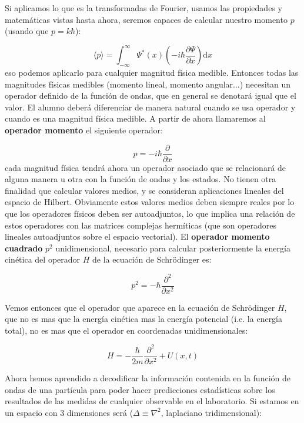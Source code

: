 \documentclass[12pt]{article}
\newcommand{\parentesis}[1]{\left( #1  \right)}
\newcommand{\parciales}[2]{\frac{\partial #1}{\partial #2}}
\newcommand{\D}{\mathrm{d}}
\newcommand{\intf}{\int_{-\infty}^{\infty}}
\begin{document}
Si aplicamos lo que es la transformadas de Fourier, usamos las propiedades y matemáticas vistas hasta ahora, seremos capaces de calcular nuestro momento $p$ (usando que $p = k \hbar$):

\begin{equation} 
\langle p \rangle = \intf \Psi^* (x) \parentesis{- i \hbar \parciales{\Psi}{x}} \D x
\end{equation}
eso podemos aplicarlo para cualquier magnitud física medible. Entonces todas las magnitudes físicas medibles (momento lineal, momento angular...) necesitan un operador definido de la función de ondas, que en general se denotará igual que el valor. El alumno deberá diferenciar de manera natural cuando se usa operador y cuando es una magnitud física medible. A partir de ahora llamaremos al \textbf{operador momento} el siguiente operador:

\begin{equation}
p = - i \hbar \parciales{}{x} 
\end{equation}
cada magnitud física tendrá ahora un operador asociado que se relacionará de alguna manera u otra con la función de ondas y los estados. No tienen otra finalidad que calcular valores medios, y se consideran aplicaciones lineales del espacio de Hilbert. Obviamente estos valores medios deben siempre reales por lo que los operadores físicos deben ser autoadjuntos, lo que implica una relación de estos operadores con las matrices complejas hermíticas (que son operadores lineales autoadjuntos sobre el espacio vectorial).  El \textbf{operador momento cuadrado} $p^2$ unidimensional, necesario para calcular posteriormente la energía cinética del operador $H$ de la ecuación de Schrödinger es:

\begin{equation}
p^2 = - \hbar \parciales{^2}{x^2}
\end{equation} 

Vemos entonces que el operador que aparece en la ecuación de Schrödinger $H$, que no es mas que la energía cinética mas la energía potencial (i.e. la energía total), no es mas que el operador en coordenadas unidimensionales:


\begin{equation}
H = - \dfrac{\hbar}{2 m} \parciales{^2}{x^2} + U(x,t)
\end{equation}

Ahora hemos aprendido a decodificar la información contenida en la función de ondas de una partícula para poder hacer predicciones estadísticas sobre los resultados de las medidas de cualquier observable en el laboratorio. Si estamos en un espacio con 3 dimensiones será ($\Delta \equiv \nabla^2$, laplaciano tridimensional):
\end{document}
